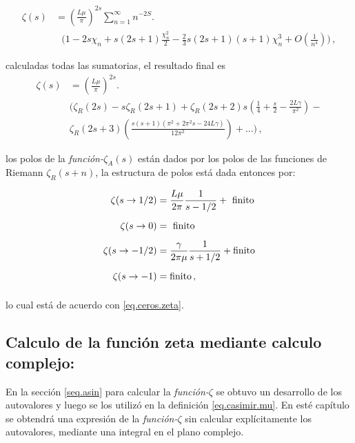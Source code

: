 \begin{align}
\zeta  (s) &= 
\left( \frac{L \mu }{\pi} \right) ^{2s}
\sum _{n=1} ^{\infty}
  n  ^{-2 S} . \\[5pt]
& \ \  \ \Bigg(
	1 - 
	2 s \chi _n +  s(2s+1) \frac{\chi _n ^2}{2} - 
	\frac{2}{3} s(2s+1)(s+1) \chi _n ^3  + O \left( \frac{1}{n ^4} \right) \Bigg)
	\, ,
	\nonumber
\end{align}

calculadas todas las sumatorias, el resultado final es
\begin{equation}
\begin{aligned}
    \zeta  (s) &= \left( \frac{L \mu }{\pi} \right) ^{2s} . \\[5pt]
	& \Bigg(
		\zeta _R ( 2 s ) -
		s \zeta _R ( 2s+1 ) +
		 \zeta _R (2s +2 ) s \left( \frac{1}{4} + \frac{s}{2} - \frac{2 L  \gamma}{\pi ^2} \right) - \\[5pt]
		 & \zeta _R (2s+3) \left(  
							\frac{s(s+1) ( \pi ^2 + 2 \pi ^2 s - 24 L \gamma)}{12 \pi ^2 }
		 					\right) 
		+ ...
		\Bigg)
		\, ,
\end{aligned}
\end{equation}


los polos de la {\it función-$\zeta _A (s)$} están dados por los polos de las funciones de Riemann $\zeta _R (s+n)$, la estructura de polos está dada entonces por:

\begin{equation}
\begin{aligned}
\zeta  (s \rightarrow 1/2) &= 
\frac{L \mu }{2 \pi } \frac{1}{s-1/2} + \ {\rm finito} \\[5pt]
\zeta  (s \rightarrow 0) &= \ {\rm finito} \\[5pt]
\zeta  (s \rightarrow -1/2) &= \frac{\gamma}{2 \pi \mu } \frac{1}{s+1/2} 
	+ {\rm finito}\\[5pt]
\zeta (s \rightarrow -1) &=  {\rm finito} 
\, ,
\\[5pt]
\end{aligned}
\label{eq.polos.asin}
\end{equation}

lo cual está de acuerdo con \ref{eq.ceros.zeta}.

\subsection{Calculo de la función zeta mediante calculo complejo:}{\label{sec.complejo}}

En la sección \ref{seq.asin} para calcular la {\it función-$\zeta$} se obtuvo un desarrollo de los autovalores y luego se los utilizó en la definición \ref{eq.casimir.mu}. En esté capítulo se obtendrá una expresión de la {\it función-$\zeta$} sin calcular explícitamente los autovalores, mediante una integral en el plano complejo.


